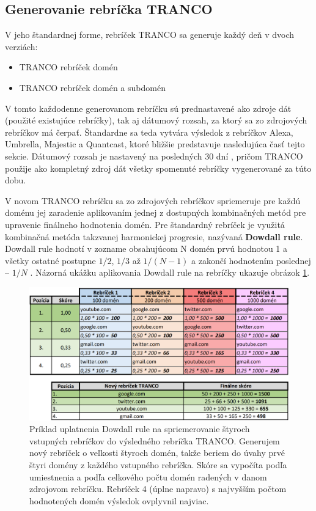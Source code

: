 \subsection{Generovanie rebríčka TRANCO}
\label{tranco-generation}

V jeho štandardnej forme, rebríček TRANCO sa generuje každý deň v dvoch verziách:
\begin{itemize}
    \item TRANCO rebríček domén
    \item TRANCO rebríček domén a subdomén
\end{itemize}

\pagebreak

V tomto každodenne generovanom rebríčku sú prednastavené ako zdroje dát (použité existujúce rebríčky), tak aj dátumový rozsah, za ktorý sa zo zdrojových rebríčkov má čerpať.
Štandardne sa teda vytvára výsledok z rebríčkov Alexa, Umbrella, Majestic a Quantcast, ktoré bližšie predstavuje nasledujúca časť tejto sekcie. 
Dátumový rozsah je nastavený na posledných 30 dní \cite{tranco-github}, pričom TRANCO použije ako kompletný zdroj dát všetky spomenuté rebríčky vygenerované za túto dobu. 

V novom TRANCO rebríčku sa zo zdrojových rebríčkov spriemeruje pre každú doménu jej zaradenie aplikovaním jednej z dostupných kombinačných metód pre upravenie finálneho hodnotenia domén.
Pre štandardný rebríček je využitá kombinačná metóda takzvanej harmonickej progresie, nazývaná \textbf{Dowdall rule}. 
Dowdall rule hodnotí v zozname obsahujúcom N domén prvú hodnotou 1 a všetky ostatné postupne \(1/2\), \(1/3\) až \(1/(N-1)\) a zakončí hodnotením poslednej -- \(1/N\) \cite{tranco, tranco-homepage}.
Názorná ukážku aplikovania Dowdall rule na rebríčky ukazuje obrázok \ref{img:dowdall-rule}.

\begin{figure}[htb]
\begin{center}
 \includegraphics[scale=0.375]{obrazky-figures/dowdall_rule.png}
 \caption{\centering Príklad uplatnenia Dowdall rule na spriemerovanie štyroch vstupných rebríčkov do výsledného rebríčka TRANCO. Generujem nový rebríček o veľkosti štyroch domén, takže beriem do úvahy prvé štyri domény z každého vstupného rebríčka. Skóre sa vypočíta podľa umiestnenia a podľa celkového počtu domén radených v danom zdrojovom rebríčku. Rebríček 4 (úplne napravo) s najvyšším počtom hodnotených domén výsledok ovplyvnil najviac.}
 \label{img:dowdall-rule}
\end{center}
\end{figure}



